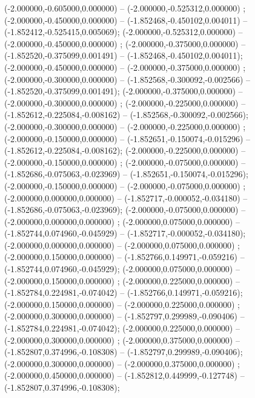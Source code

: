  (-2.000000,-0.605000,0.000000) -- (-2.000000,-0.525312,0.000000) ;
 (-2.000000,-0.450000,0.000000) -- (-1.852468,-0.450102,0.004011) -- (-1.852412,-0.525415,0.005069);
 (-2.000000,-0.525312,0.000000) -- (-2.000000,-0.450000,0.000000) ;
 (-2.000000,-0.375000,0.000000) -- (-1.852520,-0.375099,0.001491) -- (-1.852468,-0.450102,0.004011);
 (-2.000000,-0.450000,0.000000) -- (-2.000000,-0.375000,0.000000) ;
 (-2.000000,-0.300000,0.000000) -- (-1.852568,-0.300092,-0.002566) -- (-1.852520,-0.375099,0.001491);
 (-2.000000,-0.375000,0.000000) -- (-2.000000,-0.300000,0.000000) ;
 (-2.000000,-0.225000,0.000000) -- (-1.852612,-0.225084,-0.008162) -- (-1.852568,-0.300092,-0.002566);
 (-2.000000,-0.300000,0.000000) -- (-2.000000,-0.225000,0.000000) ;
 (-2.000000,-0.150000,0.000000) -- (-1.852651,-0.150074,-0.015296) -- (-1.852612,-0.225084,-0.008162);
 (-2.000000,-0.225000,0.000000) -- (-2.000000,-0.150000,0.000000) ;
 (-2.000000,-0.075000,0.000000) -- (-1.852686,-0.075063,-0.023969) -- (-1.852651,-0.150074,-0.015296);
 (-2.000000,-0.150000,0.000000) -- (-2.000000,-0.075000,0.000000) ;
 (-2.000000,0.000000,0.000000) -- (-1.852717,-0.000052,-0.034180) -- (-1.852686,-0.075063,-0.023969);
 (-2.000000,-0.075000,0.000000) -- (-2.000000,0.000000,0.000000) ;
 (-2.000000,0.075000,0.000000) -- (-1.852744,0.074960,-0.045929) -- (-1.852717,-0.000052,-0.034180);
 (-2.000000,0.000000,0.000000) -- (-2.000000,0.075000,0.000000) ;
 (-2.000000,0.150000,0.000000) -- (-1.852766,0.149971,-0.059216) -- (-1.852744,0.074960,-0.045929);
 (-2.000000,0.075000,0.000000) -- (-2.000000,0.150000,0.000000) ;
 (-2.000000,0.225000,0.000000) -- (-1.852784,0.224981,-0.074042) -- (-1.852766,0.149971,-0.059216);
 (-2.000000,0.150000,0.000000) -- (-2.000000,0.225000,0.000000) ;
 (-2.000000,0.300000,0.000000) -- (-1.852797,0.299989,-0.090406) -- (-1.852784,0.224981,-0.074042);
 (-2.000000,0.225000,0.000000) -- (-2.000000,0.300000,0.000000) ;
 (-2.000000,0.375000,0.000000) -- (-1.852807,0.374996,-0.108308) -- (-1.852797,0.299989,-0.090406);
 (-2.000000,0.300000,0.000000) -- (-2.000000,0.375000,0.000000) ;
 (-2.000000,0.450000,0.000000) -- (-1.852812,0.449999,-0.127748) -- (-1.852807,0.374996,-0.108308);

